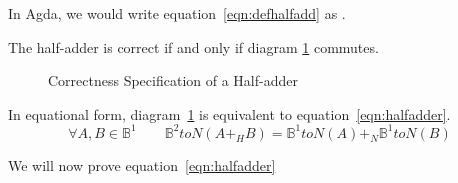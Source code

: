 \documentclass[14pt]{extarticle}  %
\theoremstyle{plain}
\theoremstyle{definition}
\theoremstyle{remark}
\begin{document}
In Agda, we would write equation~\ref{eqn:defhalfadd} as .

The half-adder is correct if and only if diagram \ref{fig:halfadder} commutes.

\begin{figure}[h]
\centering
\caption{Correctness Specification of a Half-adder}
\label{fig:halfadder}
\end{figure}

In equational form, diagram~\ref{fig:halfadder} is equivalent to equation~\ref{eqn:halfadder}.
\begin{equation}\label{eqn:halfadder}
\forall A,B \in \mathbb{B}^{1} \qquad \mathbb{B}^{2}toN(A +_{H} B) = \mathbb{B}^{1}toN(A) +_{N} \mathbb{B}^{1}toN(B)
\end{equation}

We will now prove equation~\ref{eqn:halfadder}
\end{document}
